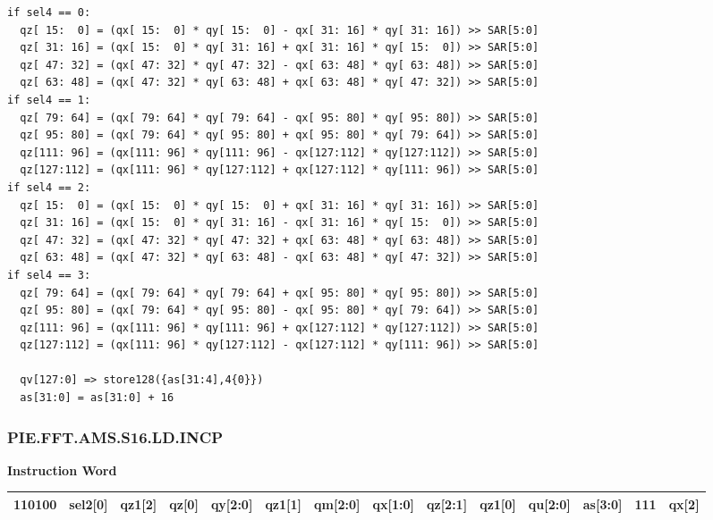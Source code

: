 \begin{lstlisting}
if sel4 == 0:
  qz[ 15:  0] = (qx[ 15:  0] * qy[ 15:  0] - qx[ 31: 16] * qy[ 31: 16]) >> SAR[5:0]
  qz[ 31: 16] = (qx[ 15:  0] * qy[ 31: 16] + qx[ 31: 16] * qy[ 15:  0]) >> SAR[5:0]
  qz[ 47: 32] = (qx[ 47: 32] * qy[ 47: 32] - qx[ 63: 48] * qy[ 63: 48]) >> SAR[5:0]
  qz[ 63: 48] = (qx[ 47: 32] * qy[ 63: 48] + qx[ 63: 48] * qy[ 47: 32]) >> SAR[5:0]
if sel4 == 1:
  qz[ 79: 64] = (qx[ 79: 64] * qy[ 79: 64] - qx[ 95: 80] * qy[ 95: 80]) >> SAR[5:0]
  qz[ 95: 80] = (qx[ 79: 64] * qy[ 95: 80] + qx[ 95: 80] * qy[ 79: 64]) >> SAR[5:0]
  qz[111: 96] = (qx[111: 96] * qy[111: 96] - qx[127:112] * qy[127:112]) >> SAR[5:0]
  qz[127:112] = (qx[111: 96] * qy[127:112] + qx[127:112] * qy[111: 96]) >> SAR[5:0]
if sel4 == 2:
  qz[ 15:  0] = (qx[ 15:  0] * qy[ 15:  0] + qx[ 31: 16] * qy[ 31: 16]) >> SAR[5:0]
  qz[ 31: 16] = (qx[ 15:  0] * qy[ 31: 16] - qx[ 31: 16] * qy[ 15:  0]) >> SAR[5:0]
  qz[ 47: 32] = (qx[ 47: 32] * qy[ 47: 32] + qx[ 63: 48] * qy[ 63: 48]) >> SAR[5:0]
  qz[ 63: 48] = (qx[ 47: 32] * qy[ 63: 48] - qx[ 63: 48] * qy[ 47: 32]) >> SAR[5:0]
if sel4 == 3:
  qz[ 79: 64] = (qx[ 79: 64] * qy[ 79: 64] + qx[ 95: 80] * qy[ 95: 80]) >> SAR[5:0]
  qz[ 95: 80] = (qx[ 79: 64] * qy[ 95: 80] - qx[ 95: 80] * qy[ 79: 64]) >> SAR[5:0]
  qz[111: 96] = (qx[111: 96] * qy[111: 96] + qx[127:112] * qy[127:112]) >> SAR[5:0]
  qz[127:112] = (qx[111: 96] * qy[127:112] - qx[127:112] * qy[111: 96]) >> SAR[5:0]

  qv[127:0] => store128({as[31:4],4{0}})
  as[31:0] = as[31:0] + 16
\end{lstlisting}

\newpage
\subsubsection{PIE.FFT.AMS.S16.LD.INCP}\label{instruction:PIEFFTAMSS16LDINCP}
\setlength\tabcolsep{5pt}
\textbf{Instruction Word} \\
\begin{tabular}{|c|c|c|c|c|c|c|c|c|c|c|c|c|c|}
	\hline
	110100 & sel2[0] & qz1[2] & qz[0] & qy[2:0] & qz1[1] & qm[2:0] & qx[1:0] & qz[2:1] & qz1[0] & qu[2:0] & as[3:0] & 111 & qx[2] \\
	\hline
\end{tabular}

